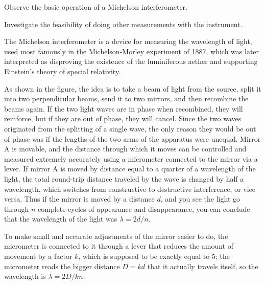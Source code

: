 \label{lab:michelson}

\apparatus
{}

\begin{goals}

\item[] Observe the basic operation of a Michelson interferometer.

\item[] Investigate the feasibility of doing other measurements with the instrument.

\end{goals}

\introduction

The Michelson interferometer is a device for measuring the wavelength of
light, used most famously in the Michelson-Morley experiment of 1887,
which was later interpreted as disproving the existence of the luminiferous
aether and supporting Einstein's theory of special relativity.


As shown in the figure, the idea is to take a beam of light from the source,
split it into two perpendicular beams, send it to two mirrors, and then recombine
the beams again. If the two light waves are in phase when recombined, they will
reinforce, but if they are out of phase, they will cancel. Since the two waves
originated from the splitting of a single wave, the only reason they would be out
of phase was if the lengths of the two arms of the apparatus were unequal. Mirror
A is movable, and the distance through which it moves can be controlled and measured
extremely accurately using a micrometer connected to the mirror via a lever.
If mirror A is moved by distance equal to a quarter of a wavelength of the light,
the total round-trip distance traveled by the wave is changed by half a wavelength,
which switches from constructive to destructive interference, or vice versa.
Thus if the mirror is moved by a distance $d$, and you see the light go through
$n$ complete cycles of appearance and disappearance, you can conclude that the
wavelength of the light was $\lambda=2d/n$.

\apparatus

To make small and accurate adjustments
of the mirror easier to do, the micrometer is connected to it through a lever that
reduces the amount of movement by a factor $k$, which is supposed to be exactly equal to 5; the micrometer reads the
bigger distance $D=kd$ that it actually travels itself, so the wavelength is
$\lambda=2D/kn$.


